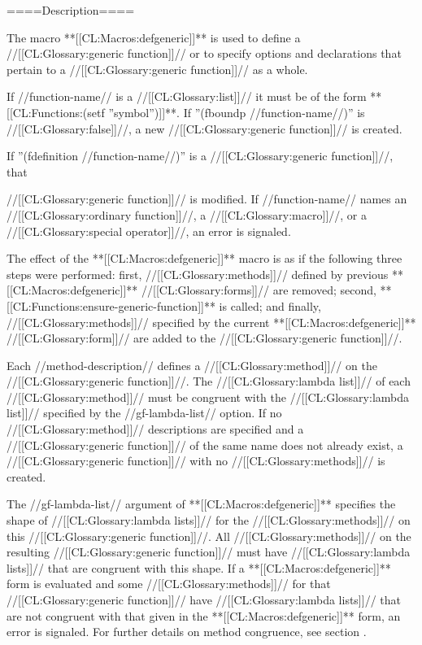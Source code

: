 ====Description====

The macro **[[CL:Macros:defgeneric]]** is used to define a //[[CL:Glossary:generic function]]// or to specify options and declarations that pertain to a //[[CL:Glossary:generic function]]// as a whole.


If //function-name// is a //[[CL:Glossary:list]]// it must be of the form **[[CL:Functions:(setf ''symbol'')]]**. If ''(fboundp //function-name//)'' is //[[CL:Glossary:false]]//, a new //[[CL:Glossary:generic function]]// is created.

If ''(fdefinition //function-name//)'' is a //[[CL:Glossary:generic function]]//, that

//[[CL:Glossary:generic function]]// is modified. If //function-name// names an //[[CL:Glossary:ordinary function]]//, a //[[CL:Glossary:macro]]//, or a //[[CL:Glossary:special operator]]//, an error is signaled.

The effect of the **[[CL:Macros:defgeneric]]** macro is as if the following three steps were performed: first, //[[CL:Glossary:methods]]// defined by previous **[[CL:Macros:defgeneric]]** //[[CL:Glossary:forms]]// are removed;  second, **[[CL:Functions:ensure-generic-function]]** is called; and finally, //[[CL:Glossary:methods]]// specified by the current **[[CL:Macros:defgeneric]]** //[[CL:Glossary:form]]// are added to the //[[CL:Glossary:generic function]]//.

Each //method-description// defines a //[[CL:Glossary:method]]// on the //[[CL:Glossary:generic function]]//. The //[[CL:Glossary:lambda list]]// of each //[[CL:Glossary:method]]// must be congruent with the //[[CL:Glossary:lambda list]]// specified by the //gf-lambda-list// option. If no //[[CL:Glossary:method]]// descriptions are specified and a //[[CL:Glossary:generic function]]// of the same name does not already exist, a //[[CL:Glossary:generic function]]// with no //[[CL:Glossary:methods]]// is created.

The //gf-lambda-list// argument of **[[CL:Macros:defgeneric]]** specifies the shape of //[[CL:Glossary:lambda lists]]// for the //[[CL:Glossary:methods]]// on this //[[CL:Glossary:generic function]]//. All //[[CL:Glossary:methods]]// on the resulting //[[CL:Glossary:generic function]]// must have //[[CL:Glossary:lambda lists]]// that are congruent with this shape. If a **[[CL:Macros:defgeneric]]** form is evaluated and some //[[CL:Glossary:methods]]// for that //[[CL:Glossary:generic function]]// have //[[CL:Glossary:lambda lists]]// that are not congruent with that given in the **[[CL:Macros:defgeneric]]** form, an error is signaled. For further details on method congruence, see section {\secref\GFMethodLambdaListCongruency}.

